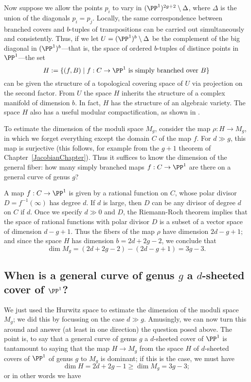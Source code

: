 Now suppose we allow the points $p_i$ to vary in $(\PP^1)^{2g+2} \setminus \Delta$, where $\Delta$ is the union of the 
diagonals $p_i=p_j$. Locally, the same correspondence between branched covers and $b$-tuples of transpositions can be carried out simultaneously and consistently. Thus, if we let $U = (\PP^1)^b \setminus \Delta$ be the complement of the big diagonal in $(\PP^1)^b$---that is, the space of ordered $b$-tuples of distince points in $\PP^1$---the set
$$
H := \{ (f, B) \mid f : C \to \PP^1 \text{ is simply branched over } B \}
$$
can be given the structure of a topological covering space of $U$ via projection on the second factor. From $U$ the space $H$ inherits the structure of a complex manifold of dimension $b$.
In fact, $H$ has the structure of an algebraic variety. The space $H$ also has a useful modular compactification, as shown in \cite{Harris-Mumford-Moduli}. 

To estimate the dimension of the moduli space $M_g$, consider the map $\rho : H \to M_g$, in which we forget everything except the domain $C$ of the map $f$. For $d \gg g$, this map is surjective (this follows, for example from the $g+1$ theorem of Chapter~\ref{JacobianChapter}). Thus it suffices to know the dimension of the general fiber: how many simply branched maps $f : C \to \PP^1$ are there on a general curve of genus $g$?

A map $f : C \to \PP^1$ is given by a rational function on $C$, whose polar divisor $D = f^{-1}(\infty)$ has degree $d$.
If $d$ is large, then $D$ can be any divisor of degree $d$ on $C$ if $d$. Once we specify $d\gg 0$ and $D$, the Riemann-Roch theorem implies that the space of rational functions with polar divisor $D$ is a subset of a vector space of dimension $d-g+1$. Thus the fibers of the map $\rho$ have dimension $2d-g+1$; and since the space $H$ has dimension $b = 2d+2g-2$, we conclude that
$$
\dim M_g = (2d+2g-2)-(2d-g+1) = 3g-3.
$$

\subsection{When is a general curve of genus $g$ a $d$-sheeted cover of $\PP^1$?}

We just used the Hurwitz space to estimate the dimension of the moduli space $M_g$; we did this by focussing on the case $d \gg  g$. Amusingly, we can now turn this around and answer (at least in one direction) the question posed above. The point is, to say that a general curve of genus $g$ a $d$-sheeted cover of $\PP^1$ is tantamount to saying that the map $H \to M_g$ from the space $H$ of $d$-sheeted covers of $\PP^1$ of genus $g$ to $M_g$ is dominant; if this is the case, we must have
$$
\dim H = 2d+2g-1 \geq \dim M_g = 3g-3;
$$
or in other words we have

